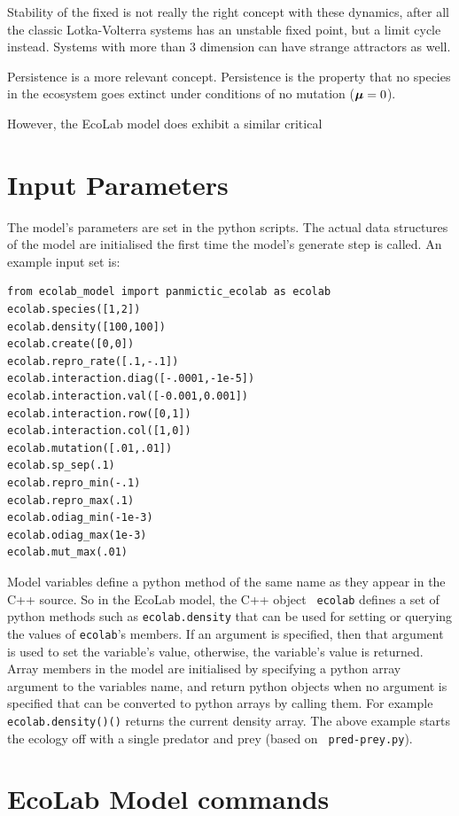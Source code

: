 \documentclass{article}
\newcommand{\bmu}{\mbox{\boldmath{$\mu$}}}       %
\begin{document}
Stability of the fixed is not really the right concept with these
dynamics, after all the classic Lotka-Volterra systems has an unstable
fixed point, but a limit cycle instead. Systems with more than 3
dimension can have strange attractors as well.

Persistence is a more relevant concept. Persistence is the property
that no species in the ecosystem goes extinct under conditions of no
mutation ($\bmu=0$). 

However, the EcoLab model does exhibit a similar critical

\section{Input Parameters}\label{input parameters}

The model's parameters are set in the python scripts.
The actual data structures of the model are initialised the first time
the model's generate step is called. An example input set is:
\begin{verbatim}
from ecolab_model import panmictic_ecolab as ecolab
ecolab.species([1,2])
ecolab.density([100,100]) 
ecolab.create([0,0])
ecolab.repro_rate([.1,-.1])
ecolab.interaction.diag([-.0001,-1e-5])
ecolab.interaction.val([-0.001,0.001])
ecolab.interaction.row([0,1])
ecolab.interaction.col([1,0])
ecolab.mutation([.01,.01])
ecolab.sp_sep(.1)
ecolab.repro_min(-.1)
ecolab.repro_max(.1)
ecolab.odiag_min(-1e-3)
ecolab.odiag_max(1e-3)
ecolab.mut_max(.01)
\end{verbatim}

Model variables define a python method of the same name as they appear
in the C++ source. So in the EcoLab model, the C++ object {\tt
  ecolab} defines a set of python methods such as {\tt ecolab.density}
that can be used for setting or querying the values of {\tt ecolab}'s
members.  If an argument is specified, then that argument is used to
set the variable's value, otherwise, the variable's value is returned.
Array members in the model are initialised by specifying a python
array argument to the variables name, and return python objects when
no argument is specified that can be converted to python arrays by
calling them. For example \verb+ecolab.density()()+ returns the
current density array. The above example starts the ecology off with a
single predator and prey (based on {\tt
  pred-prey.py}).

\section{EcoLab Model commands}
\end{document}
